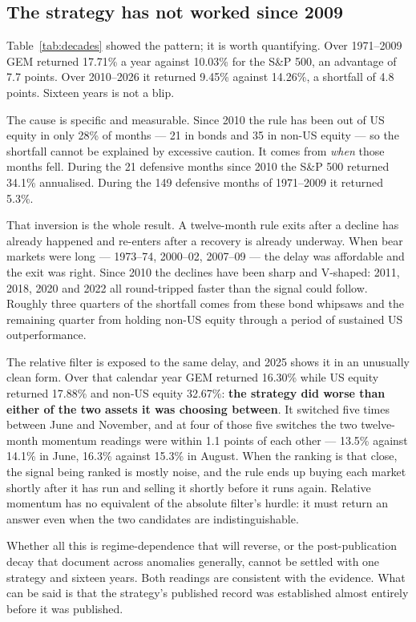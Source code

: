 \documentclass[11pt,a4paper]{article}
\let\oldsubsection\subsection
\renewcommand{\subsection}{\FloatBarrier\oldsubsection}
\begin{document}
\subsection{The strategy has not worked since 2009}

Table~\ref{tab:decades} showed the pattern; it is worth quantifying. Over
1971--2009 GEM returned 17.71\% a year against 10.03\% for the S\&P 500, an
advantage of 7.7 points. Over 2010--2026 it returned 9.45\% against 14.26\%, a
shortfall of 4.8 points. Sixteen years is not a blip.

The cause is specific and measurable. Since 2010 the rule has been out of US
equity in only 28\% of months --- 21 in bonds and 35 in non-US equity --- so
the shortfall cannot be explained by excessive caution. It comes from
\emph{when} those months fell. During the 21 defensive months since 2010 the
S\&P 500 returned 34.1\% annualised. During the 149 defensive months of
1971--2009 it returned 5.3\%.

That inversion is the whole result. A twelve-month rule exits after a decline
has already happened and re-enters after a recovery is already underway. When
bear markets were long --- 1973--74, 2000--02, 2007--09 --- the delay was
affordable and the exit was right. Since 2010 the declines have been sharp and
V-shaped: 2011, 2018, 2020 and 2022 all round-tripped faster than the signal
could follow. Roughly three quarters of the shortfall comes from these bond
whipsaws and the remaining quarter from holding non-US equity through a period
of sustained US outperformance.

The relative filter is exposed to the same delay, and 2025 shows it in an
unusually clean form. Over that calendar year GEM returned 16.30\% while US
equity returned 17.88\% and non-US equity 32.67\%: \textbf{the strategy did
worse than either of the two assets it was choosing between}. It switched five
times between June and November, and at four of those five switches the two
twelve-month momentum readings were within 1.1 points of each other --- 13.5\%
against 14.1\% in June, 16.3\% against 15.3\% in August. When the ranking is
that close, the signal being ranked is mostly noise, and the rule ends up
buying each market shortly after it has run and selling it shortly before it
runs again. Relative momentum has no equivalent of the absolute filter's
hurdle: it must return an answer even when the two candidates are
indistinguishable.

Whether all this is regime-dependence that will reverse, or the post-publication
decay that \citet{mclean2016} document across anomalies generally, cannot be
settled with one strategy and sixteen years. Both readings are consistent with
the evidence. What can be said is that the strategy's published record was
established almost entirely before it was published.
\end{document}

